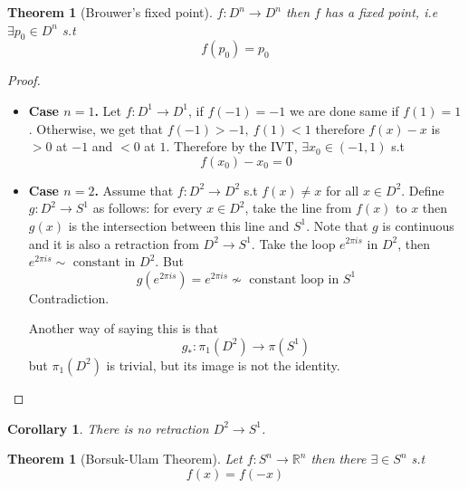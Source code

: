 \documentclass[11pt,a4paper]{article}
\theoremstyle{definition}
\theoremstyle{plain}
\newtheorem{theorem}[definition]{Theorem}
\newtheorem{corollary}[definition]{Corollary}
\theoremstyle{remark}
\newcommand{\R}{\mathbb{R}}
\newcommand{\1}{\mathbbm{1}}
\begin{document}
\begin{theorem}[Brouwer's fixed point]
    $f \colon D^n \to D^n$ then $f$ has a fixed point, i.e $\exists p_0 \in D^n$ s.t 
    $$f(p_0) = p_0$$    
\end{theorem}

\begin{proof}
    \begin{itemize}
        \item \textbf{Case $n=1$.} Let $f \colon D^1 \to D^1$, if $f(-1) = -1$ we are done same if $f(1) = 1$. Otherwise, we get that 
        $f(-1) > -1, \ f(1) < 1$ therefore $f(x) - x$ is $> 0$ at $-1$ and $< 0$ at $1$. Therefore by the IVT, $\exists x_0 \in (-1,1)$ s.t 
        $$f(x_0) - x_0 = 0$$
        
        \item \textbf{Case $n=2$.} Assume that $f \colon D^2 \to D^2$ s.t $f(x) \ne x$ for all $x \in D^2$. Define $g \colon D^2 \to S^1$ as follows: for every $x \in D^2$, take the line 
        from $f(x)$ to $x$ then $g(x)$ is the intersection between this line and $S^1$. Note that $g$ is continuous and it is also a retraction from $D^2 \to S^1$. Take the loop $e^{2 \pi i s}$ in $D^2$, 
        then $e^{2 \pi i s}  \sim \text{ constant}$ in $D^2$. But 
        $$g(e^{2 \pi i s}) = e^{2 \pi i s} \not\sim \text{ constant loop in $S^1$}$$
        Contradiction.

        Another way of saying this is that 
        $$g_* \colon \pi_1 (D^2) \to \pi(S^1)$$
        but $\pi_1(D^2)$ is trivial, but its image is not the identity. 
    \end{itemize}
\end{proof}

\begin{corollary}
    There is no retraction $D^2 \to S^1$.
\end{corollary}

\begin{theorem}[Borsuk-Ulam Theorem]
    Let $f \colon S^n \to \R^n$ then there $\exists \in S^n$ s.t 
    $$f(x) = f(-x)$$
\end{theorem}
\end{document}
